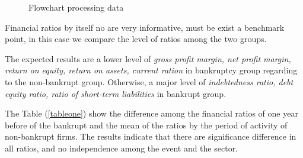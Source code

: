 \documentclass[journal]{IEEEtai}
\begin{document}
\begin{figure}[!h]
\caption{Flowchart processing data}
\label{flowchart}

\end{figure}


Financial ratios by itself no are very informative, must be exist a benchmark point, in this case we compare the level of ratios among the two groups.

The expected results are a lower level of  \textit{gross profit margin, net profit margin, return on equity, return on assets, current ration} in bankruptcy group regarding to the non-bankrupt group. Otherwise, a major level of \textit{indebtedness ratio, debt equity ratio, ratio of short-term liabilities} in bankrupt group.


The Table (\ref{tableone}) show the difference among the financial ratios of one year before of the bankrupt and the mean of the ratios by the period of activity of non-bankrupt firms.
The results indicate that there are significance difference in all ratios, and no independence among the event and the sector.
\end{document}
